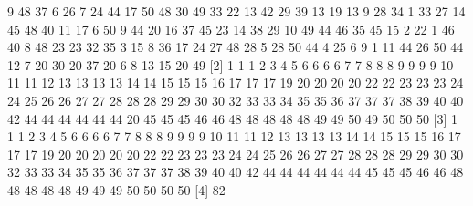 

\begin{verbbox}[\mbox{}]
[1]  9 48 37 6 26 7 24 44 17 50 48 30 49 33 22 13 42 29 39 13 19 13 9 28 34 1
33 27 14 45 48 40 11 17 6 50 9 44 20 16 37 45 23 14 38 29 10 49 44 46 35 45  
15 2 22 1 46 40 8 48 23 23 32 35 3 15 8 36 17 24 27 48 28 5 28 50 44 4 25 6 9
1 11 44 26 50 44 12 7 20 30 20 37 20 6 8 13 15 20 49
[2]  1 1 1 2 3 4 5 6 6 6 6 7 7 8 8 8 9 9 9 9 10 11 11 12 13 13 13 13 14 14 15 
15 15 16 17 17 17 19 20 20 20 20 22 22 23 23 23 24 24 25 26 26 27 27 28 28 28 
29 29 30 30 32 33 33 34 35 35 36 37 37 37 38 39 40 40 42 44 44 44 44 44 44 20 
45 45 45 46 46 48 48 48 48 48 49 49 50 49 50 50 50
[3]  1 1 1 2 3 4 5 6 6 6 6 7 7 8 8 8 9 9 9 9 10 11 11 12 13 13 13 13 14 14 15 
15 15 16 17 17 17 19 20 20 20 20 20 22 22 23 23 23 24 24 25 26 26 27 27 28 28 
28 29 29 30 30 32 33 33 34 35 35 36 37 37 37 38 39 40 40 42 44 44 44 44 44 44 
45 45 45 46 46 48 48 48 48 48 49 49 49 50 50 50 50
[4]  82
\end{verbbox}
    
